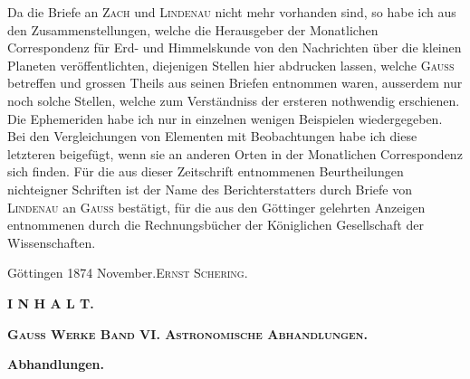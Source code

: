 \documentclass[12pt,a4paper]{article}
\begin{document}
Da die Briefe an \textsc{Zach} und \textsc{Lindenau} nicht mehr vorhanden sind, so habe ich aus den Zusammenstellungen, welche die Herausgeber der Monatlichen Correspondenz f\"ur Erd- und Himmelskunde von den Nachrichten \"uber die kleinen Planeten ver\"offentlichten, diejenigen Stellen hier abdrucken lassen, welche \textsc{Gauss} betreffen und grossen Theils aus seinen Briefen entnommen waren, ausserdem nur noch solche Stellen, welche zum Verst\"andniss der ersteren nothwendig erschienen. Die Ephemeriden habe ich nur in einzelnen wenigen Beispielen wiedergegeben. Bei den Vergleichungen von Elementen mit Beobachtungen habe ich diese letzteren beigef\"ugt, wenn sie an anderen Orten in der Monatlichen Correspondenz sich finden. F\"ur die aus dieser Zeitschrift entnommenen Beurtheilungen nichteigner Schriften ist der Name des Berichterstatters durch Briefe von \textsc{Lindenau} an \textsc{Gauss} best\"atigt, f\"ur die aus den G\"ottinger gelehrten Anzeigen entnommenen durch die Rechnungsb\"ucher der K\"oniglichen Gesellschaft der Wissenschaften.

\begin{flushright}
G\"ottingen 1874 November.\quad\textsc{Ernst Schering.}
\end{flushright}

\newpage

\begin{center}
\Large\textbf{I N H A L T.}
\end{center}

\vspace{0.3cm}

\begin{center}
\textbf{\textsc{Gauss Werke Band VI. Astronomische Abhandlungen.}}
\end{center}

\vspace{0.5cm}

\noindent\textbf{Abhandlungen.}

\vspace{1mm}
\end{document}

